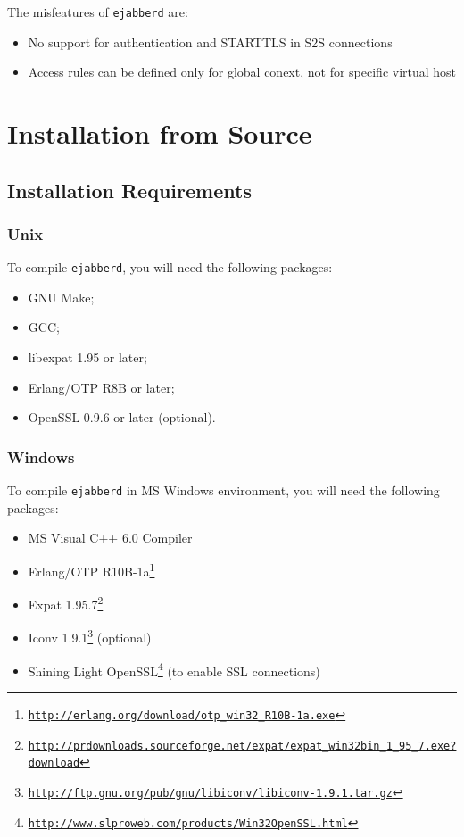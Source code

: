 \documentclass[a4paper,10pt]{article}
\newcommand{\ejabberd}{\texttt{ejabberd}}
\gdef\footahref#1#2{#2\footnote{\href{#1}{\texttt{#1}}}}
\begin{document}
The misfeatures of \ejabberd{} are:
\begin{itemize}
\item No support for authentication and STARTTLS in S2S connections
\item Access rules can be defined only for global conext, not for specific
  virtual host
\end{itemize}


\section{Installation from Source}
\label{sec:installation}

\subsection{Installation Requirements}
\label{sec:installreq}

\subsubsection{Unix}
\label{sec:installrequnix}

To compile \ejabberd{}, you will need the following packages:
\begin{itemize}
\item GNU Make;
\item GCC;
\item libexpat 1.95 or later;
\item Erlang/OTP R8B or later;
\item OpenSSL 0.9.6 or later (optional).
\end{itemize}

\subsubsection{Windows}
\label{sec:installreqwin}

To compile \ejabberd{} in MS Windows environment, you will need the following
packages:
\begin{itemize}
\item MS Visual C++ 6.0 Compiler
\item \footahref{http://erlang.org/download/otp_win32_R10B-1a.exe}{Erlang/OTP R10B-1a}
\item \footahref{http://prdownloads.sourceforge.net/expat/expat\_win32bin\_1\_95\_7.exe?download}{Expat 1.95.7}
\item
\footahref{http://ftp.gnu.org/pub/gnu/libiconv/libiconv-1.9.1.tar.gz}{Iconv 1.9.1}
(optional)
\item \footahref{http://www.slproweb.com/products/Win32OpenSSL.html}{Shining Light OpenSSL}
(to enable SSL connections)
\end{itemize}
\end{document}
